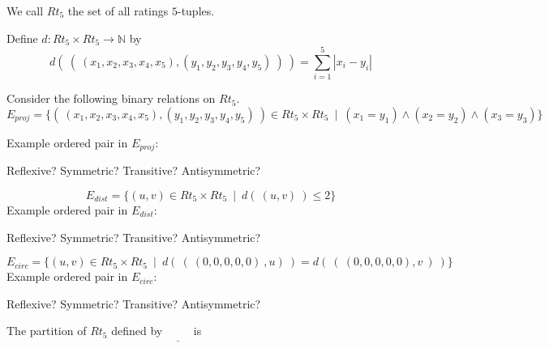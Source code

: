 \documentclass[12pt, oneside]{article}
\begin{document}
We call $Rt_5$ the set of all ratings $5$-tuples.

Define $d: Rt_5 \times Rt_5 \to \mathbb{N}$ by
\[
    d (~(~ (x_1, x_2, x_3, x_4, x_5), (y_1, y_2, y_3, y_4, y_5) ~) ~) = \sum_{i=1}^5 |x_i - y_i|
\]

Consider the following binary relations on $Rt_5$.
\[
    E_{proj} =  \{ ( ~(x_1, x_2, x_3, x_4, x_5), (y_1, y_2, y_3, y_4, y_5)~) \in
         Rt_5 \times Rt_5 ~\mid~(x_1 = y_1) \land  (x_2 = y_2) \land (x_3 = y_3) \}
\]

Example ordered pair in $E_{proj}$: 

\vspace{20pt}

Reflexive? Symmetric? Transitive? Antisymmetric?

\vspace{120pt}



\[
    E_{dist} =  \{ (u,v) \in Rt_5 \times Rt_5 ~\mid~ d( ~(u,v)~ ) \leq 2 \}
\]
Example ordered pair in $E_{dist}$: 

\vspace{20pt}

Reflexive? Symmetric? Transitive? Antisymmetric?

\vspace{120pt}


\[
E_{circ} =  \{ (u,v) \in Rt_5 \times Rt_5 ~\mid~ d(~ ( ~(0,0,0,0,0)~, u)~ ) =  d( ~(~(0,0,0,0,0),v~)~) \}
\]
Example ordered pair in $E_{circ}$: 

\vspace{20pt}

Reflexive? Symmetric? Transitive? Antisymmetric?

\vspace{120pt}

The partition of $Rt_5$ defined by $\underline{\phantom{E_{proj}}}$ is
\end{document}
